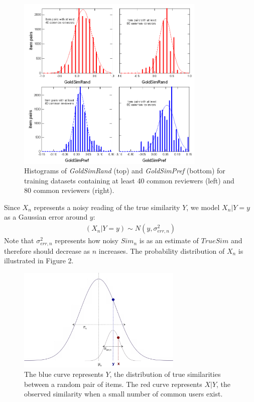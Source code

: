 \documentclass[11pt]{article}
\begin{document}
\begin{figure}[!htbp]
    \centering
    \includegraphics[width=0.8\textwidth]{Histograms.png}
	\caption{Histograms of {\em GoldSimRand} (top) and {\em GoldSimPref}
(bottom) for training datasets containing at least 40 common reviewers (left)
and 80 common reviewers (right).}
    \label{fig:Histograms}
\end{figure}


Since $X_n$ represents
a noisy reading of the true similarity $Y$, we model $X_n | Y=y$ as a Gaussian
error around $y$:
\begin{align}
(X_n | Y=y) \sim N(y, \sigma_{err, n}^2)
\end{align}
Note that $\sigma_{err, n}^2$ represents how noisy $Sim_n$ is as an estimate of
$TrueSim$ and therefore should decrease as $n$ increases. The probability
distribution of $X_n$ is illustrated in Figure 2.

\begin{figure}[!htbp]
    \centering
    \includegraphics[width=0.7\textwidth]{twonormals.png}
	\caption{The blue curve represents $Y$, the distribution of true
    similarities between a random pair of items. The red curve represents $X|Y$,
    the observed similarity when a small number of common users exist.}
    \label{fig:two_normals}
\end{figure}
\end{document}
